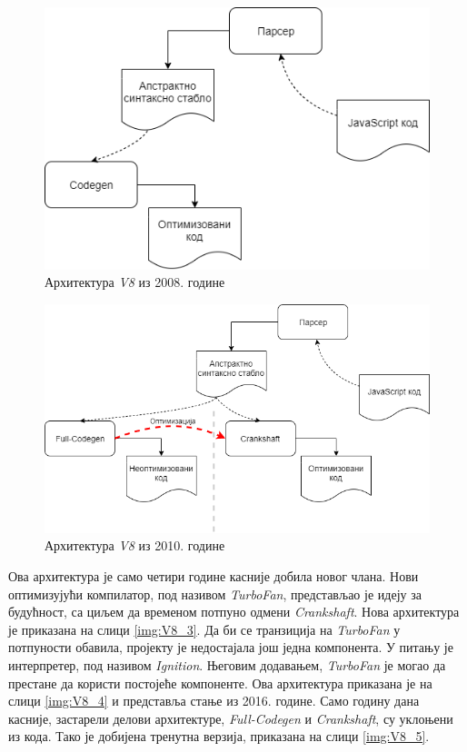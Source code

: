 \documentclass[12pt,oneside]{memoir}
\begin{document}
\begin{figure}
\begin{center}
\includegraphics[scale=0.5]{v8_1}
\caption{Архитектура \textit{V8} из 2008. године}
\label{img:V8_1}
\end{center}
\end{figure}

\begin{figure}
\begin{center}
\includegraphics[scale=0.5]{v8_2}
\caption{Архитектура \textit{V8} из 2010. године}
\label{img:V8_2}
\end{center}
\end{figure}

Ова архитектура је само четири године касније добила новог члана. Нови оптимизујући компилатор, под називом \textit{TurboFan}, представљао је идеју за будућност, са циљем да временом
потпуно одмени \textit{Crankshaft}. Нова архитектура је приказана на слици \ref{img:V8_3}. Да би се транзиција на \textit{TurboFan} у потпуности обавила, пројекту је недостајала још једна компонента.
У питању је интерпретер, под називом \textit{Ignition}. Његовим додавањем, \textit{TurboFan} је могао да престане да користи постојеће компоненте.
Ова архитектура приказана је на слици \ref{img:V8_4} и представља стање из 2016. године. Само годину дана касније, застарели делови архитектуре, \textit{Full-Codegen} и
\textit{Crankshaft}, су уклоњени из кода. Тако је добијена тренутна верзија, приказана на слици \ref{img:V8_5}.
\end{document}
